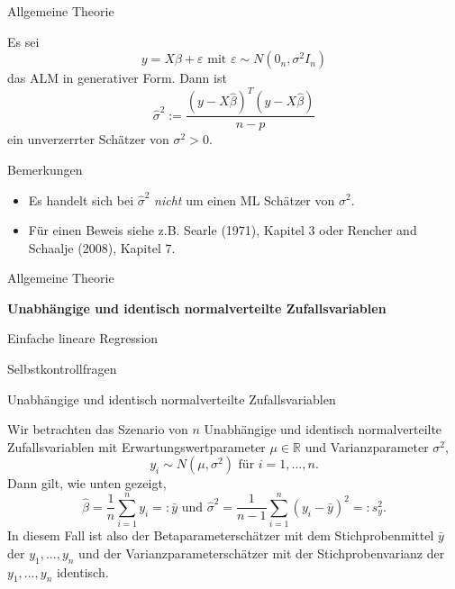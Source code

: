 \documentclass[
  8pt,
  ignorenonframetext,
]{beamer}
\providecommand{\tightlist}{%
  \setlength{\itemsep}{0pt}\setlength{\parskip}{0pt}}
\begin{document}
\begin{frame}{Allgemeine Theorie}
\protect\hypertarget{allgemeine-theorie-5}{}
\small
\begin{theorem}[Varianzparameterschätzer]
\justifying
\normalfont
Es sei 
\begin{equation}
y = X\beta + \varepsilon \mbox{ mit } \varepsilon \sim N(0_n,\sigma^2I_n)
\end{equation}
das ALM in generativer Form. Dann ist
\begin{equation}
\hat{\sigma}^2 := \frac{(y - X\hat{\beta})^T(y - X\hat{\beta})}{n - p}
\end{equation}
ein unverzerrter Schätzer von $\sigma^2 > 0$.
\end{theorem}

\footnotesize

Bemerkungen

\begin{itemize}
\tightlist
\item
  Es handelt sich bei \(\hat{\sigma}^2\) \textit{nicht} um einen ML
  Schätzer von \(\sigma^2\).
\item
  Für einen Beweis siehe z.B. Searle (1971), Kapitel 3 oder Rencher and
  Schaalje (2008), Kapitel 7.
\end{itemize}
\end{frame}

\begin{frame}{}
\protect\hypertarget{section-4}{}
\large
{}
\vfill

Allgemeine Theorie

\textbf{Unabhängige und identisch normalverteilte Zufallsvariablen}

Einfache lineare Regression

Selbstkontrollfragen \vfill
\end{frame}

\begin{frame}{Unabhängige und identisch normalverteilte
Zufallsvariablen}
\protect\hypertarget{unabhuxe4ngige-und-identisch-normalverteilte-zufallsvariablen}{}
\footnotesize

Wir betrachten das Szenario von \(n\) Unabhängige und identisch
normalverteilte Zufallsvariablen mit Erwartungswertparameter
\(\mu \in \mathbb{R}\) und Varianzparameter \(\sigma^2\),
\begin{equation}
y_i \sim N(\mu,\sigma^2) \mbox{ für } i = 1,...,n.
\end{equation} Dann gilt, wie unten gezeigt,
\begin{equation}\label{eq:iid_estimators}
\hat{\beta} = \frac{1}{n}\sum_{i=1}^n y_i =: \bar{y}
\mbox{ und }
\hat{\sigma}^2 = \frac{1}{n-1}\sum_{i=1}^n (y_i - \bar{y})^2 =: s^2_y.
\end{equation} In diesem Fall ist also der Betaparameterschätzer mit dem
Stichprobenmittel \(\bar{y}\) der \(y_1,...,y_n\) und der
Varianzparameterschätzer mit der Stichprobenvarianz der \(y_1,...,y_n\)
identisch.
\end{frame}
\end{document}
